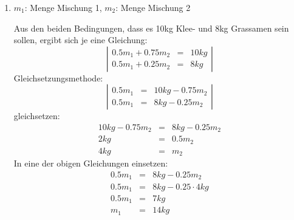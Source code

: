 \documentclass[%
11pt,%
twoside,%
titlepage,%
german,%
]{scrartcl}
\newcommand{\result}[1]{\underline{\underline{#1}}}
\begin{document}
\begin{enumerate}
\begin{enumerate}
\begin{displaymath}
\begin{array}{rcl}
        \end{array} \right|
    \end{displaymath}
    Einsetzungsmethode: Wir setzen die zweite Gleichung in die erste ein und l\"osen nach $t$ auf:
    \begin{eqnarray*}
      165t+245(t-5\unit{Fr.}) & = & 5929.5\unit{Fr.} \\
      165t+245t-1225\unit{Fr.} & = & 5929.5\unit{Fr.} \\
      410t & = & 7154.5\unit{Fr.} \\
      t & = & 17.45\unit{Fr.}
    \end{eqnarray*}
    $t$ in die zweite Gleichung einsetzen:
    \begin{displaymath}
      b = t - 5\unit{Fr.} = 12.45\unit{Fr.}
    \end{displaymath}
  Die Platten kosten pro St\"uck $\result{12.45\unit{Fr.}}$ bzw. $\result{17.45\unit{Fr.}}$


\item $m_1$: Menge Mischung 1, $m_2$: Menge Mischung 2

  Aus den beiden Bedingungen, dass es 10\unit{kg} Klee- und 8\unit{kg} Grassamen sein sollen, ergibt sich je eine Gleichung:
    \begin{displaymath}
      \left| 
        \begin{array}{rcl}
          0.5m_1 + 0.75m_2 & = & 10\unit{kg} \\
          0.5m_1 + 0.25m_2 & = & 8\unit{kg}
        \end{array} \right|
    \end{displaymath}
Gleichsetzungsmethode:
    \begin{displaymath}
      \left| 
        \begin{array}{rcl}
          0.5m_1 & = & 10\unit{kg}-0.75m_2 \\
          0.5m_1 & = & 8\unit{kg}-0.25m_2
        \end{array} \right|
    \end{displaymath}
gleichsetzen:
\begin{eqnarray*}
10\unit{kg}-0.75m_2 & = & 8\unit{kg}-0.25m_2 \\
2\unit{kg} & = & 0.5m_2 \\
4\unit{kg} & = & m_2
\end{eqnarray*}
In eine der obigen Gleichungen einsetzen:
\begin{eqnarray*}
0.5m_1 & = & 8\unit{kg}-0.25m_2 \\
0.5m_1 & = & 8\unit{kg}-0.25\cdot 4\unit{kg} \\
0.5m_1 & = & 7\unit{kg} \\
m_1 & = & 14\unit{kg}
\end{eqnarray*}



\end{enumerate}
\end{enumerate}
\end{document}
